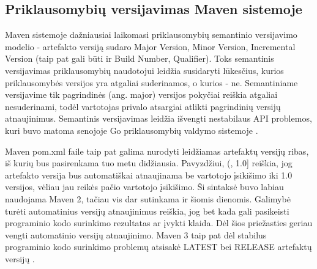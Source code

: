 \subsection{Priklausomybių versijavimas Maven sistemoje}

Maven sistemoje dažniausiai laikomasi priklausomybių semantinio versijavimo modelio -
artefakto versiją sudaro Major Version, Minor Version, Incremental Version
(taip pat gali būti ir Build Number, Qualifier). Toks semantinis versijavimas priklausomybių
naudotojui leidžia susidaryti lūkesčius, kurios priklausomybės versijos yra atgaliai suderinamos,
o kurios - ne. Semantiniame versijavime tik pagrindinės (ang. major) versijos pokyčiai reiškia atgaliai
nesuderinami, todėl vartotojas privalo atsargiai atlikti pagrindinių versijų atnaujinimus. Semantinis versijavimas
leidžia išvengti nestabilaus API problemos, kuri buvo matoma senojoje Go priklausomybių valdymo sistemoje \cite{ORACLEa}.

Maven pom.xml faile taip pat galima nurodyti leidžiamas artefaktų versijų ribas, iš kurių bus pasirenkama tuo metu
didžiausia. Pavyzdžiui, (,  1.0] reiškia, jog artefakto versija bus automatiškai atnaujinama be vartotojo įsikišimo
iki 1.0 versijos, vėliau jau reikės pačio vartotojo įsikišimo. Ši sintaksė buvo labiau naudojama Maven 2, tačiau vis
dar sutinkama ir šiomis dienomis. Galimybė turėti automatinius versijų atnaujinimus reiškia, jog bet kada gali pasikeisti
programinio kodo surinkimo rezultatas ar įvykti klaida. Dėl šios priežasties geriau vengti automatinio versijų atnaujinimo.
Maven 3 taip pat dėl stabilus programinio kodo surinkimo problemų atsisakė LATEST bei RELEASE artefaktų versijų \cite{LIG18}.
